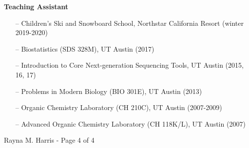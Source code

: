 \documentclass[margin,line]{CV}
\begin{document}
\begin{resume}
{\bf Teaching Assistant}
\begin{itemize}
\item[--] Children's Ski and Snowboard School, Northstar California Resort (winter 2019-2020)
\item[--] Biostatistics (SDS 328M), UT Austin (2017)
\item[--] Introduction to Core Next-generation Sequencing Tools, UT Austin (2015, 16, 17)
\item[--] Problems in Modern Biology (BIO 301E), UT Austin (2013)
\item[--] Organic Chemistry Laboratory (CH 210C), UT Austin (2007-2009)
\item[--] Advanced Organic Chemistry Laboratory (CH 118K/L), UT Austin (2007)
\end{itemize}


\vspace{11 cm}
{\centerline {Rayna M. Harris - Page 4 of 4}}


\end{resume}
\end{document}
